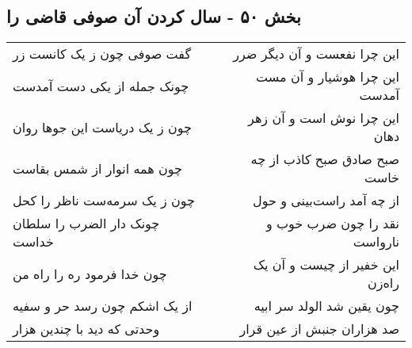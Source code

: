 \begin{center}
\section*{بخش ۵۰ - سال کردن آن صوفی قاضی را}
\label{sec:sh050}
\begin{longtable}{l p{0.5cm} r}
گفت صوفی چون ز یک کانست زر
&&
این چرا نفعست و آن دیگر ضرر
\\
چونک جمله از یکی دست آمدست
&&
این چرا هوشیار و آن مست آمدست
\\
چون ز یک دریاست این جوها روان
&&
این چرا نوش است و آن زهر دهان
\\
چون همه انوار از شمس بقاست
&&
صبح صادق صبح کاذب از چه خاست
\\
چون ز یک سرمه‌ست ناظر را کحل
&&
از چه آمد راست‌بینی و حول
\\
چونک دار الضرب را سلطان خداست
&&
نقد را چون ضرب خوب و نارواست
\\
چون خدا فرمود ره را راه من
&&
این خفیر از چیست و آن یک راه‌زن
\\
از یک اشکم چون رسد حر و سفیه
&&
چون یقین شد الولد سر ابیه
\\
وحدتی که دید با چندین هزار
&&
صد هزاران جنبش از عین قرار
\\
\end{longtable}
\end{center}

